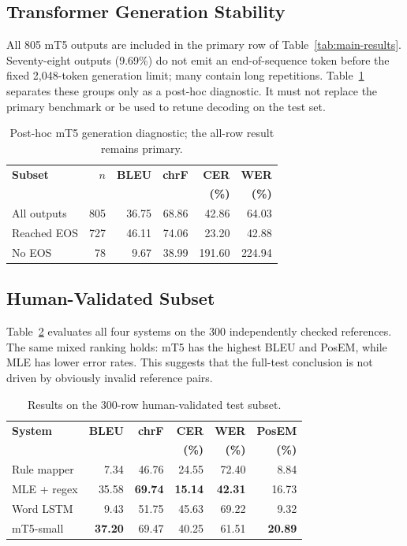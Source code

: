\documentclass[runningheads]{llncs}
\begin{document}
\subsection{Transformer Generation Stability}

All 805 mT5 outputs are included in the primary row of Table~\ref{tab:main-results}. Seventy-eight outputs (9.69\%) do not emit an end-of-sequence token before the fixed 2,048-token generation limit; many contain long repetitions. Table~\ref{tab:eos} separates these groups only as a post-hoc diagnostic. It must not replace the primary benchmark or be used to retune decoding on the test set.

\begin{table}[H]
\centering
\caption{Post-hoc mT5 generation diagnostic; the all-row result remains primary.}
\label{tab:eos}
\small
\begin{tabular}{lrrrrr}
\toprule
\textbf{Subset} & \textbf{$n$} & \textbf{BLEU} & \textbf{chrF} & \textbf{CER} & \textbf{WER} \\
 & & & & \textbf{(\%)} & \textbf{(\%)} \\
\midrule
All outputs & 805 & 36.75 & 68.86 & 42.86 & 64.03 \\
Reached EOS & 727 & 46.11 & 74.06 & 23.20 & 42.88 \\
No EOS & 78 & 9.67 & 38.99 & 191.60 & 224.94 \\
\bottomrule
\end{tabular}
\end{table}

\subsection{Human-Validated Subset}

Table~\ref{tab:curated} evaluates all four systems on the 300 independently checked references. The same mixed ranking holds: mT5 has the highest BLEU and PosEM, while MLE has lower error rates. This suggests that the full-test conclusion is not driven by obviously invalid reference pairs.

\begin{table}[H]
\centering
\caption{Results on the 300-row human-validated test subset.}
\label{tab:curated}
\small
\setlength{\tabcolsep}{4pt}
\begin{tabular}{lrrrrr}
\toprule
\textbf{System} & \textbf{BLEU} & \textbf{chrF} & \textbf{CER} & \textbf{WER} & \textbf{PosEM} \\
 & & & \textbf{(\%)} & \textbf{(\%)} & \textbf{(\%)} \\
\midrule
Rule mapper & 7.34 & 46.76 & 24.55 & 72.40 & 8.84 \\
MLE + regex & 35.58 & \textbf{69.74} & \textbf{15.14} & \textbf{42.31} & 16.73 \\
Word LSTM & 9.43 & 51.75 & 45.63 & 69.22 & 9.32 \\
mT5-small & \textbf{37.20} & 69.47 & 40.25 & 61.51 & \textbf{20.89} \\
\bottomrule
\end{tabular}
\end{table}
\end{document}
